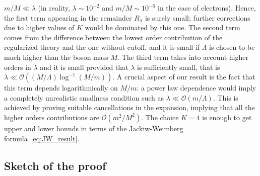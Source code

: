\documentclass[a4paper, 11pt]{article}
\newcommand{\BigO}{\mathcal{O}}								%
\newcommand{\cutoff}{\Lambda}								%
\theoremstyle{thm}
\begin{document}
$m/M \ll \lambda$ (in reality, $\lambda\sim 10^{-2}$ and $m/M\sim 10^{-6}$ in the case of electrons). Hence, the first term appearing in the remainder $R_\lambda$ is surely small; further corrections due to higher values of $K$ would be dominated by this one. The second term comes from the difference between the lowest order contribution of the regularized theory and the one without cutoff, and it is small if $\Lambda$ is chosen to be much higher than the boson mass $M$. 
The third term takes into account higher orders in $\lambda$ and it is small provided that $\lambda$ is sufficiently small, that is $\lambda \ll \BigO( (M/\Lambda)\log^{-1}(M/m))$. A crucial aspect of our result is the fact that this term depends logarithmically on $M/m$: a power law dependence would imply a completely unrealistic smallness condition such as $\lambda \ll \BigO(m/\cutoff)$. This is achieved by proving suitable cancellations in the expansion, implying that all the higher orders contributions are $\BigO(m^2/M^2)$. The choice $K=4$ is enough to get upper and lower bounds in terms of the Jackiw-Weimberg formula~\eqref{eq:JW_result}.



\subsection{Sketch of the proof}
\end{document}

